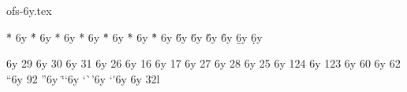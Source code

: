 

\protectreading ofs-6y.tex %

\accentdef \"  *   6y  {}
\accentdef \'  *   6y  {}
\accentdef \.  *   6y  {}
\accentdef \=  *   6y  {}
\accentdef \^  *   6y  {}
\accentdef \`  *   6y  {}
\accentdef \~  *   6y  {}
\accentdef \H  *   6y  {}
\accentdef \u  *   6y  {}
\accentdef \v  *   6y  {}
\accentdef \r  *   6y  {}
\accentdef \b  *   6y  {} %
\accentdef \d  *   6y  {}        %

\def\aa{\r a}
\def\AA{\r A}

\let\SS=\relax \let\AE=\relax \let\OE=\relax \let\O=\relax
\let\ss=\relax \let\ae=\relax \let\oe=\relax \let\o=\relax
\characterdef \AE                6y  29
\characterdef \OE                6y  30
\characterdef \O                 6y  31
\characterdef \ae                6y  26
\characterdef \dotlessi          6y  16
\characterdef \dotlessj          6y  17
\characterdef \oe                6y  27
\characterdef \o                 6y  28
\characterdef \ss                6y  25
\characterdef \textemdash        6y  124
\characterdef \textendash        6y  123
\characterdef \textexclamdown    6y  60
\characterdef \textquestiondown  6y  62
\characterdef \textquotedblleft  6y  92
\characterdef \textquotedblright 6y  `\"
\characterdef \textquoteleft     6y  `\`
\characterdef \textquoteright    6y  `\'

\characterdef \Lslash  6y  {\plainL}   
\characterdef \lslash  6y  {\char32l}

\let\i=\dotlessi  \let\j=\dotlessj
\let\L=\Lslash    \let\l=\lslash

